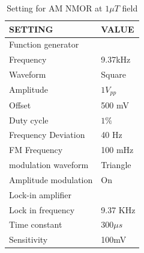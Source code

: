 \begin{itemize}
\begin{table}[h]
\begin{tabular}{|l |l|}
\textbf{ SETTING}    & \textbf{VALUE} \\
\hline
Function generator &   \\
\hline
Frequency & 9.37kHz   \\

Waveform    &  Square  \\

Amplitude   &  $1V_{pp}$  \\
Offset  &       500 mV  \\
Duty cycle       &    $1\%$ \\
Frequency Deviation     &   40 Hz  \\
FM Frequency     &   100 mHz  \\
modulation waveform      &    Triangle \\
Amplitude modulation & On \\
\hline
Lock-in amplifier &     \\
\hline
Lock in frequency     & 9.37 KHz \\
Time constant     &  $300\mu s$ \\
Sensitivity      &  100mV  \\
\hline
\end{tabular}
\caption{Setting for AM NMOR at $1\mu T$ field}
\end{table}


\end{itemize}
